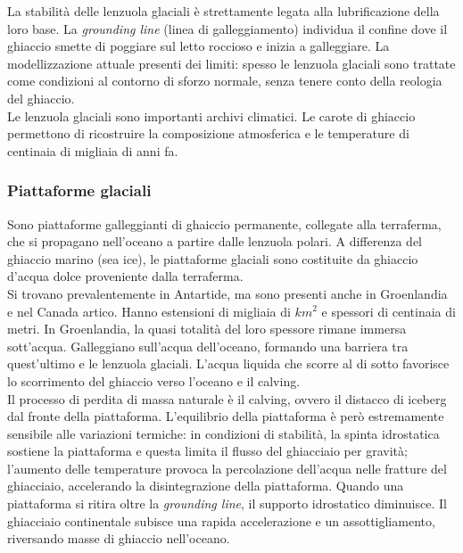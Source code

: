 \documentclass[a4paper,12pt]{book}
\begin{document}
\noindent
La stabilità delle lenzuola glaciali è strettamente legata alla lubrificazione della loro base.
La \textit{grounding line} (linea di galleggiamento) individua il confine dove il ghiaccio smette di poggiare sul letto roccioso e inizia a galleggiare.
La modellizzazione attuale presenti dei limiti: spesso le lenzuola glaciali sono trattate come condizioni al contorno di sforzo normale, senza tenere conto della reologia del ghiaccio.\\

\noindent
Le lenzuola glaciali sono importanti archivi climatici.
Le carote di ghiaccio permettono di ricostruire la composizione atmosferica e le temperature di centinaia di migliaia di anni fa.

\subsubsection{\textcolor{colore2}{Piattaforme glaciali}}

Sono piattaforme galleggianti di ghaiccio permanente, collegate alla terraferma, che si propagano nell'oceano a partire dalle lenzuola polari.
A differenza del ghiaccio marino (sea ice), le piattaforme glaciali sono costituite da ghiaccio d'acqua dolce proveniente dalla terraferma.\\

\noindent
Si trovano prevalentemente in Antartide, ma sono presenti anche in Groenlandia e nel Canada artico.
Hanno estensioni di migliaia di $km^2$ e spessori di centinaia di metri. In Groenlandia, la quasi totalità del loro spessore rimane immersa sott'acqua.
Galleggiano sull'acqua dell'oceano, formando una barriera tra quest'ultimo e le lenzuola glaciali.
L'acqua liquida che scorre al di sotto favorisce lo scorrimento del ghiaccio verso l'oceano e il calving.\\

\noindent
Il processo di perdita di massa naturale è il calving, ovvero il distacco di iceberg dal fronte della piattaforma.
L'equilibrio della piattaforma è però estremamente sensibile alle variazioni termiche:
in condizioni di stabilità, la spinta idrostatica sostiene la piattaforma e questa limita il flusso del ghiacciaio per gravità;
l'aumento delle temperature provoca la percolazione dell'acqua nelle fratture del ghiacciaio, accelerando la disintegrazione della piattaforma.
Quando una piattaforma si ritira oltre la \textit{grounding line}, il supporto idrostatico diminuisce. Il ghiacciaio continentale subisce una rapida accelerazione e un assottigliamento, riversando masse di ghiaccio nell'oceano.\\
\end{document}
